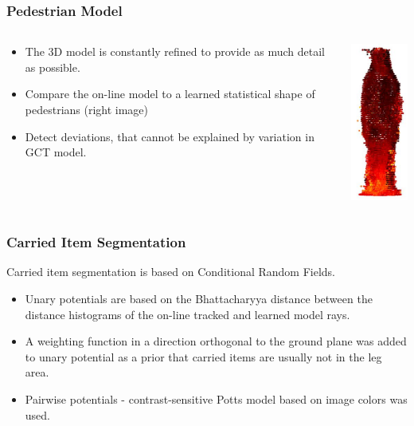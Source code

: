 \documentclass{beamer}
\begin{document}
\begin{frame}
\frametitle{Pedestrian Model} 
\begin{columns}[T]
    \begin{column}{.7\textwidth}
		\begin{center}
		 	\begin{itemize}
			  \item The 3D model is constantly refined to provide as much detail as possible.
			  \item Compare the on-line model to a learned statistical shape of pedestrians (right image)
			  \item Detect deviations, that cannot be explained by variation in GCT model.
			\end{itemize}
		\end{center}
    \end{column}
    \begin{column}{.3\textwidth}
    	\includegraphics[width=2.5cm]{pedestian_model.jpg}
    \end{column}
\end{columns}
\end{frame}


\begin{frame}
\frametitle{Carried Item Segmentation} 
Carried item segmentation is based on Conditional Random Fields.
	\begin {itemize}
		\item Unary potentials are based on the Bhattacharyya distance between the distance histograms of the on-line tracked and learned model rays.
		\item A weighting function in a direction orthogonal to the ground plane was added to unary potential as a prior that carried items are usually not in the leg area.
		\item Pairwise potentials - contrast-sensitive Potts model based on image colors was used.
	\end{itemize}
\end{frame}
\end{document}
